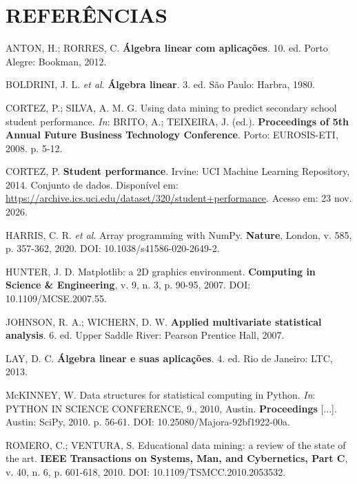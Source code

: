 \documentclass[12pt,a4paper]{article}
\begin{document}
\section*{REFERÊNCIAS}
\begin{singlespace}
\begin{flushleft}
\noindent ANTON, H.; RORRES, C. \textbf{Álgebra linear com aplicações}. 10. ed. Porto Alegre: Bookman, 2012.

\vspace{6pt}
\noindent BOLDRINI, J. L. \textit{et al}. \textbf{Álgebra linear}. 3. ed. São Paulo: Harbra, 1980.

\vspace{6pt}
\noindent CORTEZ, P.; SILVA, A. M. G. Using data mining to predict secondary school student performance. \textit{In}: BRITO, A.; TEIXEIRA, J. (ed.). \textbf{Proceedings of 5th Annual Future Business Technology Conference}. Porto: EUROSIS-ETI, 2008. p. 5-12.

\vspace{6pt}
\noindent CORTEZ, P. \textbf{Student performance}. Irvine: UCI Machine Learning Repository, 2014. Conjunto de dados. Disponível em: \url{https://archive.ics.uci.edu/dataset/320/student+performance}. Acesso em: 23 nov. 2026.

\vspace{6pt}
\noindent HARRIS, C. R. \textit{et al}. Array programming with NumPy. \textbf{Nature}, London, v. 585, p. 357-362, 2020. DOI: 10.1038/s41586-020-2649-2.

\vspace{6pt}
\noindent HUNTER, J. D. Matplotlib: a 2D graphics environment. \textbf{Computing in Science \& Engineering}, v. 9, n. 3, p. 90-95, 2007. DOI: 10.1109/MCSE.2007.55.

\vspace{6pt}
\noindent JOHNSON, R. A.; WICHERN, D. W. \textbf{Applied multivariate statistical analysis}. 6. ed. Upper Saddle River: Pearson Prentice Hall, 2007.

\vspace{6pt}
\noindent LAY, D. C. \textbf{Álgebra linear e suas aplicações}. 4. ed. Rio de Janeiro: LTC, 2013.

\vspace{6pt}
\noindent McKINNEY, W. Data structures for statistical computing in Python. \textit{In}: PYTHON IN SCIENCE CONFERENCE, 9., 2010, Austin. \textbf{Proceedings} [...]. Austin: SciPy, 2010. p. 56-61. DOI: 10.25080/Majora-92bf1922-00a.

\vspace{6pt}
\noindent ROMERO, C.; VENTURA, S. Educational data mining: a review of the state of the art. \textbf{IEEE Transactions on Systems, Man, and Cybernetics, Part C}, v. 40, n. 6, p. 601-618, 2010. DOI: 10.1109/TSMCC.2010.2053532.


\end{flushleft}
\end{singlespace}
\end{document}
